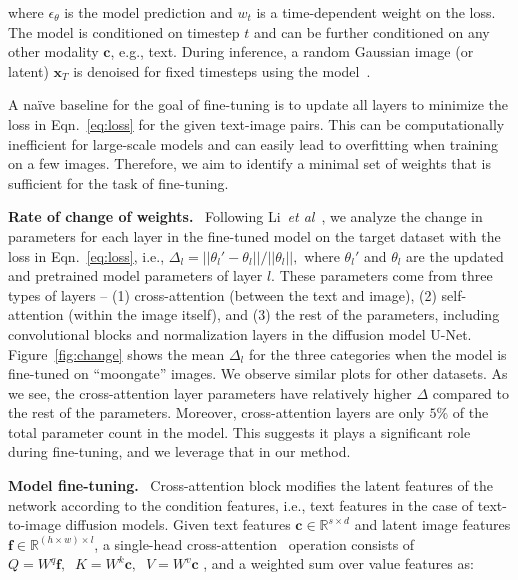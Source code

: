 where $\epsilon_{\theta}$ is the model prediction and $w_t$ is a time-dependent weight on the loss. The model is conditioned on timestep $t$ and can be further conditioned on any other modality ${\mathbf{c}}$, e.g., text. During inference, a random Gaussian image (or latent) ${\mathbf{x}}_T$ is denoised for fixed timesteps using the model~\cite{song2020denoising}. 

 A na\"{i}ve baseline for the goal of fine-tuning is to update all layers to minimize the loss in Eqn.~\ref{eq:loss} for the given text-image pairs. This can be computationally inefficient for large-scale models and can easily lead to overfitting when training on a few images. Therefore, we aim to identify a minimal set of weights that is sufficient for the task of fine-tuning.

  \textbf{Rate of change of weights.} \  Following Li~\emph{et al}\onedot~\cite{li2020few}, we analyze the change in parameters for each layer in the fine-tuned model on the target dataset with the loss in Eqn.~\ref{eq:loss}, i.e., $\Delta_l =  ||\theta_{l}' - \theta_{l}||/||\theta_{l}||,$
where $\theta_{l}'$ and $\theta_{l}$ are the updated and pretrained model parameters of layer $l$. These parameters come from three types of layers --  (1) cross-attention (between the text and image), (2) self-attention (within the image itself), and (3) the rest of the parameters, including convolutional blocks and normalization layers in the diffusion model U-Net. Figure~\ref{fig:change} shows the mean $\Delta_l$ for the three categories when the model is fine-tuned on ``moongate'' images. We observe similar plots for other datasets. As we see, the cross-attention layer parameters have relatively higher $\Delta$ compared to the rest of the parameters. Moreover, cross-attention layers are only $5\%$ of the total parameter count in the model. This suggests it plays a significant role during fine-tuning, and we leverage that in our method. 

  \textbf{Model fine-tuning.} \ 
Cross-attention block modifies the latent features of the network according to the condition features, i.e., text features in the case of text-to-image diffusion models. Given text features ${\mathbf{c}} \in \mathbb{R}^{s \times d}$ and latent image features ${\mathbf{f}} \in \mathbb{R}^{ (h\times w) \times l}$, a single-head cross-attention~\cite{vaswani2017attention} operation consists of $Q = W^q {\mathbf{f}}, \;\; K = W^{k}{\mathbf{c}}, \;\; V = W^{v}{\mathbf{c}}$
, and a weighted sum over value features as:

